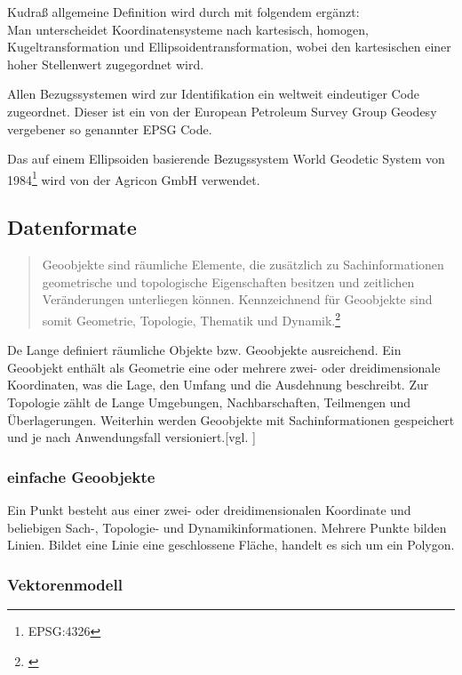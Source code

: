 Kudraß allgemeine Definition wird durch \cite[S.141 ff.]{book:gi-theopluspraxis3} mit folgendem ergänzt:\\
Man unterscheidet Koordinatensysteme nach kartesisch, homogen, Kugeltransformation und Ellipsoidentransformation, wobei den kartesischen einer hoher Stellenwert zugegordnet wird.

Allen Bezugssystemen wird zur Identifikation ein weltweit eindeutiger Code zugeordnet.
Dieser ist ein von der European Petroleum Survey Group Geodesy vergebener so genannter EPSG Code.

Das auf einem Ellipsoiden basierende Bezugssystem World Geodetic System von 1984\footnote{EPSG:4326} wird von der Agricon GmbH verwendet.


\subsection{Datenformate}


\begin{quote}
Geoobjekte sind räumliche Elemente, die zusätzlich zu Sachinformationen geometrische und topologische Eigenschaften besitzen und zeitlichen Veränderungen unterliegen können. Kennzeichnend für Geoobjekte sind somit Geometrie, Topologie, Thematik und Dynamik.\footnote{\cite[S.133]{book:gi-theopluspraxis3}}
\end{quote}
De Lange definiert räumliche Objekte bzw. Geoobjekte ausreichend.
Ein Geoobjekt enthält als Geometrie eine oder mehrere zwei- oder dreidimensionale Koordinaten, was die Lage, den Umfang und die Ausdehnung beschreibt.
Zur Topologie zählt de Lange Umgebungen, Nachbarschaften, Teilmengen und Überlagerungen.
Weiterhin werden Geoobjekte mit Sachinformationen gespeichert und je nach Anwendungsfall versioniert.[vgl. \cite[S.133]{book:gi-theopluspraxis3}]


\subsubsection{einfache Geoobjekte}

Ein Punkt besteht aus einer zwei- oder dreidimensionalen Koordinate und beliebigen Sach-, Topologie- und Dynamikinformationen.
Mehrere Punkte bilden Linien.
Bildet eine Linie eine geschlossene Fläche, handelt es sich um ein Polygon.

\subsubsection{Vektorenmodell}

